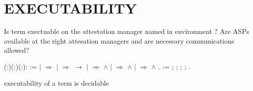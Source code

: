 \documentclass[12pt]{report}
\begin{document}
\section{EXECUTABILITY}




 Is term  exectuable on the attestation manager named  in 
    environment ?  Are ASPs available at the right attesation managers
    and are necessary communications allowed? 
\begin{coqdoccode}
\coqdocemptyline
\coqdocnoindent
{} (:)(:)(:): :=\coqdoceol
\coqdocnoindent
{}  \coqdoceol
\coqdocnoindent
\ensuremath{|}    \ensuremath{\Rightarrow}    \coqdoceol
\coqdocnoindent
\ensuremath{|}    \ensuremath{\Rightarrow}     \ensuremath{\rightarrow}    \coqdoceol
\coqdocnoindent
\ensuremath{|}    \ensuremath{\Rightarrow}     \ensuremath{\land}    \coqdoceol
\coqdocnoindent
\ensuremath{|}  \coqdocvar{\_}   \ensuremath{\Rightarrow}     \ensuremath{\land}    \coqdoceol
\coqdocnoindent
\ensuremath{|}  \coqdocvar{\_}   \ensuremath{\Rightarrow}     \ensuremath{\land}    \coqdoceol
\coqdocnoindent
{}.\coqdoceol
\coqdocemptyline
\coqdocnoindent
{}   := ;  ;  ;  ; .\coqdoceol
\coqdocemptyline
\end{coqdoccode}
executability of a term is decidable 
\end{document}
